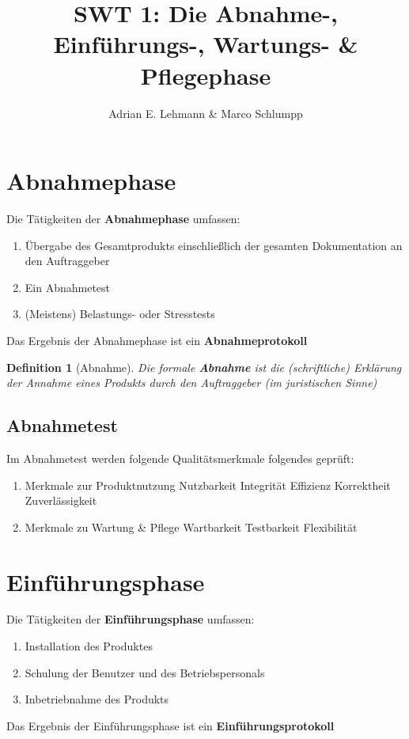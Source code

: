 \documentclass[a4paper]{article}
\title{SWT 1: Die Abnahme-, Einführungs-, Wartungs- \& Pflegephase}
\author{Adrian E. Lehmann \& Marco Schlumpp}
\theoremstyle{break}
\newtheorem{defi}{Definition}[section]
\begin{document}
	\maketitle
	\tableofcontents
	\newpage

\section{Abnahmephase}
Die Tätigkeiten der \textbf{Abnahmephase} umfassen:
\begin{enumerate}
	\item Übergabe des Gesamtprodukts einschließlich der gesamten Dokumentation an den Auftraggeber
	\item Ein Abnahmetest
	\item (Meistens) Belastungs- oder Stresstests
\end{enumerate}
Das Ergebnis der Abnahmephase ist ein \textbf{Abnahmeprotokoll}
\begin{defi}[Abnahme]
	Die formale \textbf{Abnahme} ist die (schriftliche) Erklärung der Annahme eines Produkts durch den Auftraggeber (im juristischen Sinne)
\end{defi}
	
\subsection{Abnahmetest}
Im Abnahmetest werden folgende Qualitätsmerkmale folgendes geprüft:\newline
\begin{enumerate}
	\item Merkmale zur Produktnutzung
		\subitem Nutzbarkeit
		\subitem Integrität
		\subitem Effizienz
		\subitem Korrektheit 
		\subitem Zuverlässigkeit
	\item Merkmale zu Wartung \& Pflege
		\subitem Wartbarkeit
		\subitem Testbarkeit
		\subitem Flexibilität
\end{enumerate}
\section{Einführungsphase}
Die Tätigkeiten der \textbf{Einführungsphase} umfassen:
\begin{enumerate}
	\item Installation des Produktes
	\item Schulung der Benutzer und des Betriebspersonals
	\item Inbetriebnahme des Produkts
\end{enumerate}
Das Ergebnis der Einführungsphase ist ein \textbf{Einführungsprotokoll}
\end{document}
